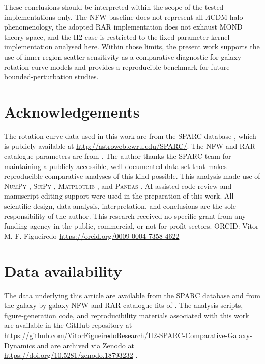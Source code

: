 \documentclass[fleqn,usenatbib]{mnras}
\begin{document}
These conclusions should be interpreted within the scope of the tested implementations only. The NFW baseline does not represent all $\Lambda$CDM halo phenomenology, the adopted RAR implementation does not exhaust MOND theory space, and the H2 case is restricted to the fixed-parameter kernel implementation analysed here. Within those limits, the present work supports the use of inner-region scatter sensitivity as a comparative diagnostic for galaxy rotation-curve models and provides a reproducible benchmark for future bounded-perturbation studies.


\section*{Acknowledgements}
The rotation-curve data used in this work are from the SPARC database
\citep{Lelli2016}, which is publicly available at
\url{http://astroweb.cwru.edu/SPARC/}. The NFW and RAR catalogue
parameters are from \citet{Li2020}. The author thanks the SPARC team
for maintaining a publicly accessible, well-documented data set that
makes reproducible comparative analyses of this kind possible. This
analysis made use of \textsc{NumPy} \citep{numpy2020},
\textsc{SciPy} \citep{scipy2020}, \textsc{Matplotlib}
\citep{matplotlib2007}, and \textsc{Pandas} \citep{pandas2010}.
AI-assisted code review and manuscript editing support were used in the
preparation of this work. All scientific design, data analysis,
interpretation, and conclusions are the sole responsibility of the
author. This research received no specific grant from any funding
agency in the public, commercial, or not-for-profit sectors.
ORCID: Vitor M. F. Figueiredo \url{https://orcid.org/0009-0004-7358-4622}
\section*{Data availability}
The data underlying this article are available from the SPARC database
\citep{Lelli2016} and from the galaxy-by-galaxy NFW and RAR catalogue
fits of \citet{Li2020}. The analysis scripts, figure-generation code,
and reproducibility materials associated with this work are available in
the GitHub repository at
\url{https://github.com/VitorFigueiredoResearch/H2-SPARC-Comparative-Galaxy-Dynamics}
and are archived via Zenodo at
\url{https://doi.org/10.5281/zenodo.18793232}
\citep{FigueiredoH2zenodo2026}.
	
	
	
	
\end{document}
